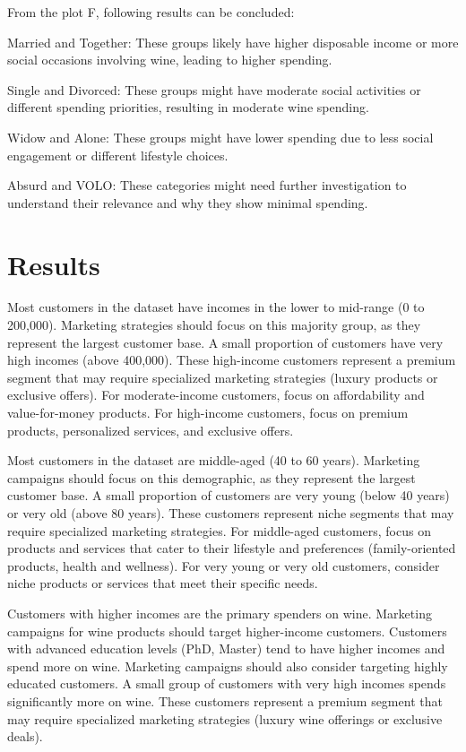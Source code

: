 \documentclass[a4paper]{article}
\begin{document}
\begin{multicols}{2}
From the plot F, following results can be concluded:\

Married and Together: These groups likely have higher disposable income or more social occasions involving wine, leading to higher spending.\

Single and Divorced: These groups might have moderate social activities or different spending priorities, resulting in moderate wine spending.\

Widow and Alone: These groups might have lower spending due to less social engagement or different lifestyle choices.\

Absurd and VOLO: These categories might need further investigation to understand their relevance and why they show minimal spending.




\section{Results}

Most customers in the dataset have incomes in the lower to mid-range (0 to 200,000).
Marketing strategies should focus on this majority group, as they represent the largest customer base.
A small proportion of customers have very high incomes (above 400,000).
These high-income customers represent a premium segment that may require specialized marketing strategies (luxury products or exclusive offers).
For moderate-income customers, focus on affordability and value-for-money products.
For high-income customers, focus on premium products, personalized services, and exclusive offers.


Most customers in the dataset are middle-aged (40 to 60 years).
Marketing campaigns should focus on this demographic, as they represent the largest customer base.
A small proportion of customers are very young (below 40 years) or very old (above 80 years).
These customers represent niche segments that may require specialized marketing strategies.
For middle-aged customers, focus on products and services that cater to their lifestyle and preferences (family-oriented products, health and wellness).
For very young or very old customers, consider niche products or services that meet their specific needs.


Customers with higher incomes are the primary spenders on wine.
Marketing campaigns for wine products should target higher-income customers.
Customers with advanced education levels (PhD, Master) tend to have higher incomes and spend more on wine.
Marketing campaigns should also consider targeting highly educated customers.
A small group of customers with very high incomes spends significantly more on wine.
These customers represent a premium segment that may require specialized marketing strategies (luxury wine offerings or exclusive deals).



\end{multicols}
\end{document}
